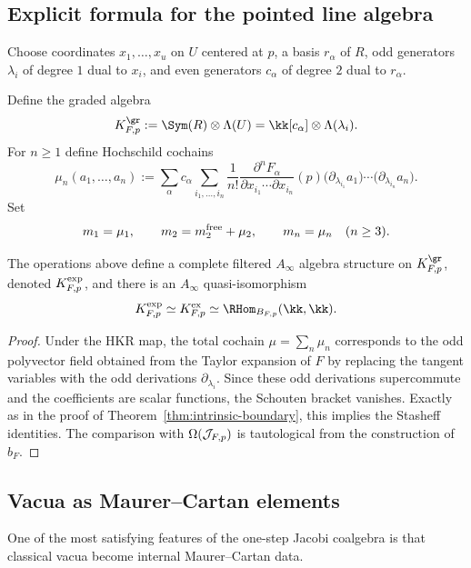 \subsection{Explicit formula for the pointed line algebra}

Choose coordinates $x_1,\dots,x_u$ on $U$ centered at $p$, a basis $r_\alpha$ of $R$, odd generators $\lambda_i$ of degree $1$ dual to $x_i$, and even generators $c_\alpha$ of degree $2$ dual to $r_\alpha$.

Define the graded algebra
\[
K_{F,p}^{\gr}:=\Sym(R)\ot \Lambda(U)=\kk[c_\alpha]\ot \Lambda(\lambda_i).
\]
For $n\ge 1$ define Hochschild cochains
\begin{equation}\label{eq:mu-F-explicit}
\mu_n(a_1,\dots,a_n)
:=
\sum_{\alpha}
c_\alpha
\sum_{i_1,\dots,i_n}
\frac{1}{n!}
\frac{\partial^n F_\alpha}{\partial x_{i_1}\cdots \partial x_{i_n}}(p)
\bigl(\partial_{\lambda_{i_1}}a_1\bigr)\cdots \bigl(\partial_{\lambda_{i_n}}a_n\bigr).
\end{equation}
Set
\[
m_1=\mu_1,
\qquad
m_2=m_2^{\mathrm{free}}+\mu_2,
\qquad
m_n=\mu_n\quad (n\ge 3).
\]

\begin{corollary}\label{cor:explicit-line}
The operations above define a complete filtered $A_\infty$ algebra structure on $K_{F,p}^{\gr}$, denoted $K^{\mathrm{exp}}_{F,p}$, and there is an $A_\infty$ quasi-isomorphism
\[
K^{\expmod}_{F,p}\simeq K^{\mathrm{ex}}_{F,p}\simeq \RHom_{B_{F,p}}(\kk,\kk).
\]
\end{corollary}

\begin{proof}
Under the HKR map, the total cochain $\mu=\sum_n \mu_n$ corresponds to the odd polyvector field obtained from the Taylor expansion of $F$ by replacing the tangent variables with the odd derivations $\partial_{\lambda_i}$. Since these odd derivations supercommute and the coefficients are scalar functions, the Schouten bracket vanishes. Exactly as in the proof of Theorem~\ref{thm:intrinsic-boundary}, this implies the Stasheff identities. The comparison with $\operatorname{\Omega}(\mathcal J_{F,p})$ is tautological from the construction of $b_F$.
\end{proof}

\subsection{Vacua as Maurer--Cartan elements}

One of the most satisfying features of the one-step Jacobi coalgebra is that classical vacua become internal Maurer--Cartan data.


